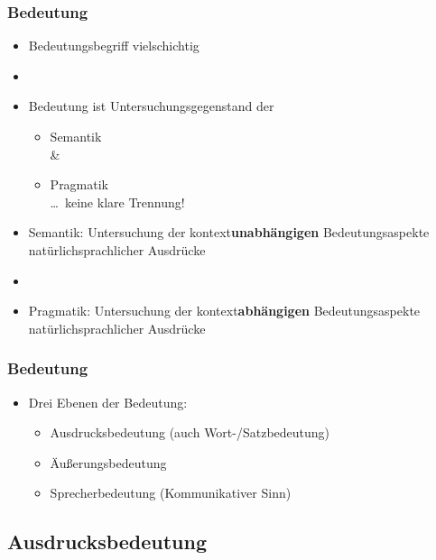 \begin{frame}
\frametitle{Bedeutung}

\begin{itemize}
	\item Bedeutungsbegriff \ras vielschichtig
	\item[]
	\item Bedeutung ist Untersuchungsgegenstand der
	
	\begin{itemize}
		\item Semantik\\ \&
		\item Pragmatik\\ 
		\hfill \dots\  keine klare Trennung!
	\end{itemize}

\pause 
	
	\item Semantik: Untersuchung der kontext\textbf{unabhängigen} Bedeutungsaspekte natürlichsprachlicher Ausdrücke
	\item[]
	\item Pragmatik: Untersuchung der kontext\textbf{abhängigen} Bedeutungsaspekte  natürlichsprachlicher Ausdrücke
\end{itemize}

\end{frame}


\begin{frame}
\frametitle{Bedeutung}

\begin{itemize}
	\item Drei Ebenen der Bedeutung:
	
	\begin{itemize}
		\item Ausdrucksbedeutung (auch Wort-/Satzbedeutung)
		\item Äußerungsbedeutung
		\item Sprecherbedeutung (Kommunikativer Sinn)
	\end{itemize}
	
\end{itemize}

\end{frame}


%
\subsection{Ausdrucksbedeutung}
%

